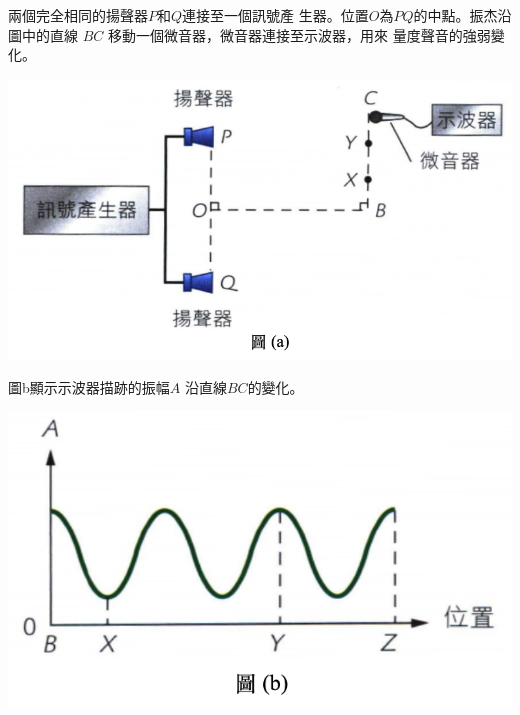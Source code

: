 {
    兩個完全相同的揚聲器$P$和$Q$連接至一個訊號產 生器。位置$O$為$PQ$的中點。振杰沿圖中的直線 $BC$ 移動一個微音器，微音器連接至示波器，用來 量度聲音的強弱變化。
    \par{\par\centering\includegraphics[width=.45\textwidth]{./img/ch4_earlyclass_wave_lq_2024-05-14-14-26-52.png}\par}
    圖b顯示示波器描跡的振幅$A$ 沿直線$BC$的變化。
    \par{\par\centering\includegraphics[width=.45\textwidth]{./img/ch4_earlyclass_wave_lq_2024-05-14-14-28-04.png}\par}
    }
